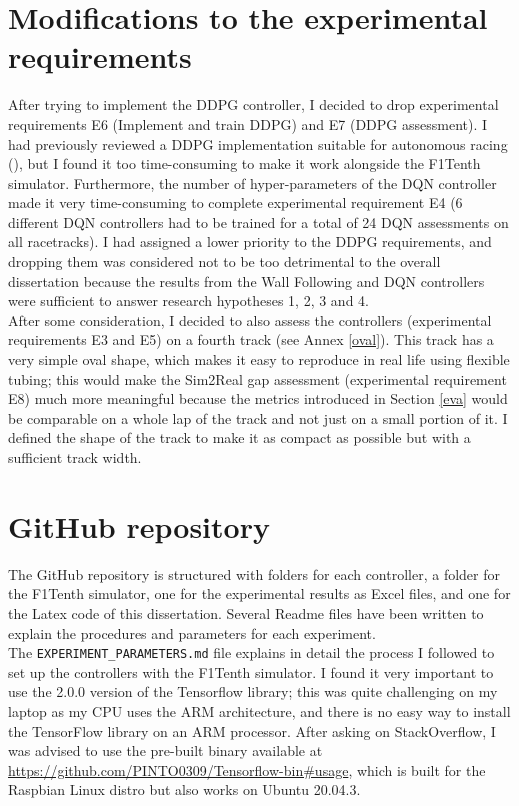 \section{Modifications to the experimental requirements}
After trying to implement the DDPG controller, I decided to drop experimental requirements E6 (Implement and train DDPG) and E7 (DDPG assessment). I had previously reviewed a DDPG implementation suitable for autonomous racing (\cite{Reference4}), but I found it too time-consuming to make it work alongside the F1Tenth simulator. Furthermore, the number of hyper-parameters of the DQN controller made it very time-consuming to complete experimental requirement E4 (6 different DQN controllers had to be trained for a total of 24 DQN assessments on all racetracks). I had assigned a lower priority to the DDPG requirements, and dropping them was considered not to be too detrimental to the overall dissertation because the results from the Wall Following and DQN controllers were sufficient to answer research hypotheses 1, 2, 3 and 4. \\
After some consideration, I decided to also assess the controllers (experimental requirements E3 and E5) on a fourth track (see Annex \ref{oval}). This track has a very simple oval shape, which makes it easy to reproduce in real life using flexible tubing; this would make the Sim2Real gap assessment (experimental requirement E8) much more meaningful because the metrics introduced in Section \ref{eva} would be comparable on a whole lap of the track and not just on a small portion of it. I defined the shape of the track to make it as compact as possible but with a sufficient track width. \\
\section{GitHub repository}
The GitHub repository is structured with folders for each controller, a folder for the F1Tenth simulator, one for the experimental results as Excel files, and one for the Latex code of this dissertation. Several Readme files have been written to explain the procedures and parameters for each experiment. \\
The \verb|EXPERIMENT_PARAMETERS.md| file explains in detail the process I followed to set up the controllers with the F1Tenth simulator. I found it very important to use the 2.0.0 version of the Tensorflow library; this was quite challenging on my laptop as my CPU uses the ARM architecture, and there is no easy way to install the TensorFlow library on an ARM processor. After asking on StackOverflow, I was advised to use the pre-built binary available at \url{https://github.com/PINTO0309/Tensorflow-bin#usage}, which is built for the Raspbian Linux distro but also works on Ubuntu 20.04.3. 


